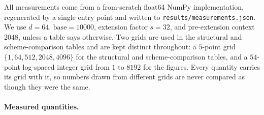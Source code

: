 \documentclass{article}
\theoremstyle{plain}
\theoremstyle{remark}
\begin{document}
All measurements come from a from-scratch float64 NumPy implementation,
regenerated by a single entry point and written to
\texttt{results/measurements.json}. We use $d = 64$, $\mathrm{base} = 10000$,
extension factor $s = 32$, and pre-extension context $2048$, unless a table
says otherwise. Two grids are used in the structural and scheme-comparison
tables and are kept distinct throughout: a
$5$-point grid $\{1, 64, 512, 2048, 4096\}$ for the structural and
scheme-comparison tables, and a $54$-point log-spaced integer grid from $1$ to
$8192$ for the figures. Every quantity carries its grid with it, so numbers
drawn from different grids are never compared as though they were the same.

\paragraph{Measured quantities.}
\end{document}
